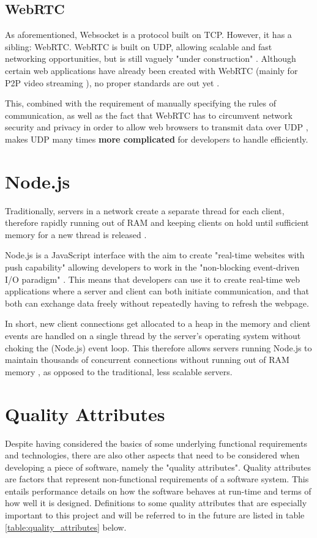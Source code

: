 \documentclass[bsc, 12pt, twoside, singlespacing, parskip, abbrevs, notimes, normalheadings, logo]{styles/infthesis}
\begin{document}
\subsection{WebRTC}
As aforementioned, Websocket is a protocol built on TCP. However, it has a sibling: WebRTC. WebRTC is built on UDP, allowing scalable and fast networking opportunities, but is still vaguely "under construction" \cite{Browser_Networking}. Although certain web applications have already been created with WebRTC (mainly for P2P video streaming \cite{P2P_Video_Streaming_HTML5_WebRTC, Where_WebRTC}), no proper standards are out yet \cite{Web_Apps_Superior}.

This, combined with the requirement of manually specifying the rules of communication, as well as the fact that WebRTC has to circumvent network security and privacy in order to allow web browsers to transmit data over UDP \cite{P2P_Video_Streaming_HTML5_WebRTC}, makes UDP many times \textbf{more complicated} for developers to handle efficiently.

\section{Node.js}
Traditionally, servers in a network create a separate thread for each client, therefore rapidly running out of RAM and keeping clients on hold until sufficient memory for a new thread is released \cite{Why_Nodejs}.

Node.js is a JavaScript interface with the aim to create "real-time websites with push capability" allowing developers to work in the "non-blocking event-driven I/O paradigm" \cite{Why_Nodejs}. This means that developers can use it to create real-time web applications where a server and client can both initiate communication, and that both can exchange data freely without repeatedly having to refresh the webpage.

In short, new client connections get allocated to a heap in the memory and client events are handled on a single thread by the server's operating system without choking the (Node.js) event loop. This therefore allows servers running Node.js to maintain thousands of concurrent connections without running out of RAM memory \cite{Node_Stress_Test, NodeJS_Image}, as opposed to the traditional, less scalable servers.


\section{Quality Attributes}
Despite having considered the basics of some underlying functional requirements and technologies, there are also other aspects that need to be considered when developing a piece of software, namely the "quality attributes". Quality attributes are factors that represent non-functional requirements of a software system. This entails performance details on how the software behaves at run-time and terms of how well it is designed. Definitions to some quality attributes that are especially important to this project and will be referred to in the future are listed in table \ref{table:quality_attributes} below.
 
\end{document}
